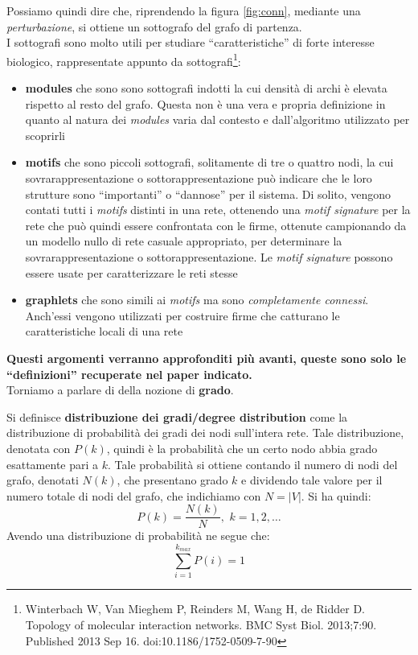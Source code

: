 \documentclass[a4paper,12pt, oneside]{book}
\begin{document}
Possiamo quindi dire che, riprendendo la figura \ref{fig:conn}, mediante una
\textit{perturbazione}, si ottiene un sottografo del grafo di partenza. \\
I sottografi sono molto utili per studiare ``caratteristiche'' di forte
interesse biologico, rappresentate appunto da sottografi\footnote{Winterbach W,
  Van Mieghem 
  P, Reinders M, Wang H, de Ridder D. Topology of molecular interaction
  networks. BMC Syst Biol. 2013;7:90. Published 2013 Sep
  16. doi:10.1186/1752-0509-7-90}:  
\begin{itemize}
  \item \textbf{modules} che sono sono sottografi indotti la cui densità di
  archi è elevata rispetto al resto del grafo. Questa non è una vera e propria
  definizione in quanto al natura dei \textit{modules} varia dal contesto e
  dall'algoritmo utilizzato per scoprirli 
  \item \textbf{motifs} che sono piccoli sottografi, solitamente di tre o
  quattro nodi, 
  la cui sovrarappresentazione o sottorappresentazione può indicare che le loro
  strutture sono ``importanti'' o ``dannose'' per il sistema. Di solito, vengono
  contati 
  tutti i \textit{motifs} distinti in una rete, ottenendo una \textit{motif
    signature} per la 
  rete che può quindi essere confrontata con le firme, ottenute campionando da
  un modello nullo di rete casuale appropriato, per determinare la 
  sovrarappresentazione o sottorappresentazione. Le \textit{motif
    signature} possono essere usate per caratterizzare le reti stesse
  \item \textbf{graphlets} che sono simili ai \textit{motifs} ma sono
  \textit{completamente connessi}. Anch'essi vengono utilizzati per costruire
  firme che catturano le caratteristiche locali di una rete  
\end{itemize}
\textbf{Questi argomenti verranno approfonditi più avanti, queste sono solo le
  ``definizioni'' recuperate nel paper indicato.}\\
Torniamo a parlare di della nozione di \textbf{grado}.
\begin{definizione}
  Si definisce \textbf{distribuzione dei gradi/degree distribution} come la
  distribuzione di 
  probabilità dei gradi dei nodi sull'intera rete. Tale distribuzione, denotata
  con $P(k)$, quindi è la
  probabilità che un certo nodo abbia grado esattamente pari a $k$. Tale
  probabilità si ottiene contando il numero di nodi del grafo, denotati $N(k)$,
  che presentano grado $k$ e dividendo tale valore per il numero totale di nodi
  del grafo, che indichiamo con $N=|V|$. Si ha quindi:
  \[P(k)=\frac{N(k)}{N},\,\,k=1,2,\ldots\]
  Avendo una distribuzione di probabilità ne segue che:
  \[\sum_{i=1}^{k_{max}} P(i)=1\]
\end{definizione}
\end{document}
